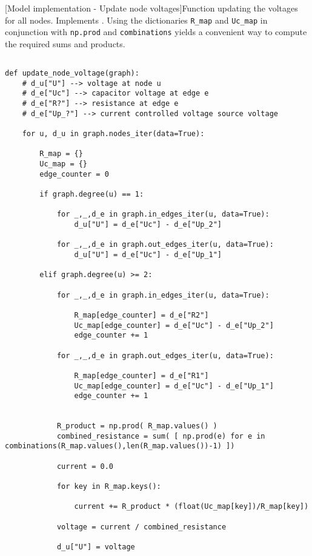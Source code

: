 \begin{codesnippet}
[Model implementation - Update node voltages]{Function updating the voltages for all nodes. Implements . Using the dictionaries \texttt{R_map} and \texttt{Uc_map} in conjunction with \texttt{np.prod} and \texttt{combinations} yields a convenient way to compute the required sums and products.}
\label{code:node_voltage}
\begin{verbatim}

def update_node_voltage(graph):
	# d_u["U"] --> voltage at node u
	# d_e["Uc"] --> capacitor voltage at edge e
	# d_e["R?"] --> resistance at edge e
	# d_e["Up_?"] --> current controlled voltage source voltage

	for u, d_u in graph.nodes_iter(data=True):
			
		R_map = {}
		Uc_map = {}
		edge_counter = 0

		if graph.degree(u) == 1:

			for _,_,d_e in graph.in_edges_iter(u, data=True):
				d_u["U"] = d_e["Uc"] - d_e["Up_2"]

			for _,_,d_e in graph.out_edges_iter(u, data=True):
				d_u["U"] = d_e["Uc"] - d_e["Up_1"]

		elif graph.degree(u) >= 2:

			for _,_,d_e in graph.in_edges_iter(u, data=True):

				R_map[edge_counter] = d_e["R2"]
				Uc_map[edge_counter] = d_e["Uc"] - d_e["Up_2"]
				edge_counter += 1

			for _,_,d_e in graph.out_edges_iter(u, data=True):

				R_map[edge_counter] = d_e["R1"]
				Uc_map[edge_counter] = d_e["Uc"] - d_e["Up_1"]
				edge_counter += 1


			R_product = np.prod( R_map.values() )
			combined_resistance = sum( [ np.prod(e) for e in combinations(R_map.values(),len(R_map.values())-1) ])

			current = 0.0

			for key in R_map.keys():

				current += R_product * (float(Uc_map[key])/R_map[key])

			voltage = current / combined_resistance
		
			d_u["U"] = voltage

\end{verbatim}

\end{codesnippet}

